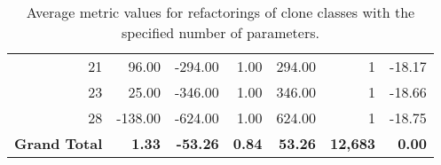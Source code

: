 \begin{appendices}
\begin{table}[H]
{\begin{tabular}{@{}rrrrrrr@{}}
21 & 96.00 & -294.00 & 1.00 & 294.00 & 1 & -18.17 \\
23 & 25.00 & -346.00 & 1.00 & 346.00 & 1 & -18.66 \\
28 & -138.00 & -624.00 & 1.00 & 624.00 & 1 & -18.75 \\ \midrule
\textbf{Grand Total} & \textbf{1.33} & \textbf{-53.26} & \textbf{0.84} & \textbf{53.26} & \textbf{12,683} & \textbf{0.00} \\ \bottomrule
\end{tabular}%
}
\caption{Average metric values for refactorings of clone classes with the specified number of parameters.}
\label{tab:full-arguments}
\end{table}

\end{appendices}
